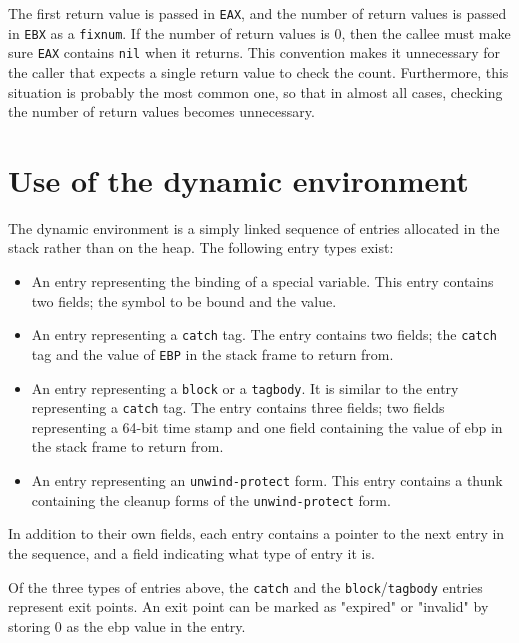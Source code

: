 The first return value is passed in \texttt{EAX}, and the number of
return values is passed in \texttt{EBX} as a \texttt{fixnum}.  If the
number of return values is $0$, then the callee must make sure
\texttt{EAX} contains \texttt{nil} when it returns.  This convention
makes it unnecessary for the caller that expects a single return value
to check the count.  Furthermore, this situation is probably the most
common one, so that in almost all cases, checking the number of return
values becomes unnecessary.

\section{Use of the dynamic environment}

The dynamic environment is a simply linked sequence of entries
allocated in the stack rather than on the heap.  The following entry
types exist:

\begin{itemize}
  \item An entry representing the binding of a special variable.  This
    entry contains two fields; the symbol to be bound and the value.

  \item An entry representing a \texttt{catch} tag.  The entry
    contains two fields; the \texttt{catch} tag and the value of
    \texttt{EBP} in the stack frame to return from.

  \item An entry representing a \texttt{block} or a \texttt{tagbody}.
    It is similar to the entry representing a \texttt{catch} tag.  The
    entry contains three fields; two fields representing a 64-bit time
    stamp and one field containing the value of ebp in the stack frame
    to return from.

  \item An entry representing an \texttt{unwind-protect} form.  This
    entry contains a thunk containing the cleanup forms of the
    \texttt{unwind-protect} form.
\end{itemize}

In addition to their own fields, each entry contains a pointer to the
next entry in the sequence, and a field indicating what type of entry
it is.

Of the three types of entries above, the \texttt{catch} and the
\texttt{block}/\texttt{tagbody} entries represent exit points.  An
exit point can be marked as "expired" or "invalid" by storing 0 as the
ebp value in the entry.

